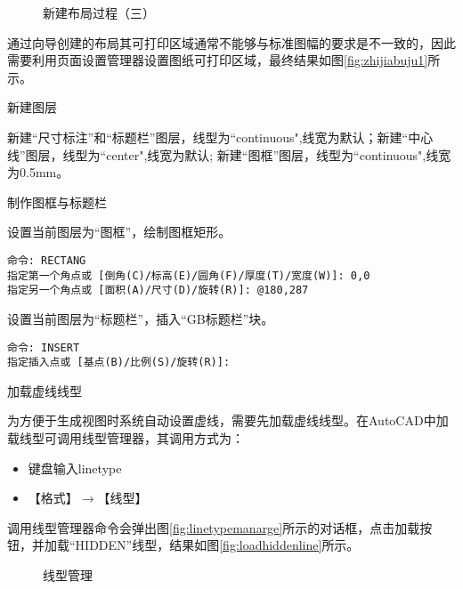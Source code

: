 \begin{procedure}
\begin{figure}[htbp]
\centering
{}\hspace{20pt}
\caption{新建布局过程（三）}
\end{figure}

通过向导创建的布局其可打印区域通常不能够与标准图幅的要求是不一致的，因此需要利用页面设置管理器设置图纸可打印区域，最终结果如图\ref{fig:zhijiabuju1}所示。

\item 新建图层

新建“尺寸标注”和“标题栏”图层，线型为“continuous",线宽为默认；新建“中心线”图层，线型为“center",线宽为默认; 新建“图框”图层，线型为“continuous",线宽为0.5mm。

\item 制作图框与标题栏

设置当前图层为“图框”，绘制图框矩形。
\begin{lstlisting}
命令: RECTANG
指定第一个角点或 [倒角(C)/标高(E)/圆角(F)/厚度(T)/宽度(W)]: 0,0
指定另一个角点或 [面积(A)/尺寸(D)/旋转(R)]: @180,287
\end{lstlisting}

设置当前图层为“标题栏”，插入“GB标题栏”块。
\begin{lstlisting}
命令: INSERT
指定插入点或 [基点(B)/比例(S)/旋转(R)]:
\end{lstlisting}

\begin{figure}[htbp]
\centering

\end{figure}
\item 加载虚线线型

为方便于生成视图时系统自动设置虚线，需要先加载虚线线型。在AutoCAD中加载线型可调用线型管理器，其调用方式为：
\begin{itemize}
\item 键盘输入linetype
\item 【格式】$\rightarrow $【线型】
\end{itemize}

调用线型管理器命令会弹出图\ref{fig:linetypemanarge}所示的对话框，点击加载按钮，并加载“HIDDEN”线型，结果如图\ref{fig:loadhiddenline}所示。

\begin{figure}[htbp]
\centering
{}\hspace{20pt}
\caption{线型管理}
\end{figure}


\end{procedure}
